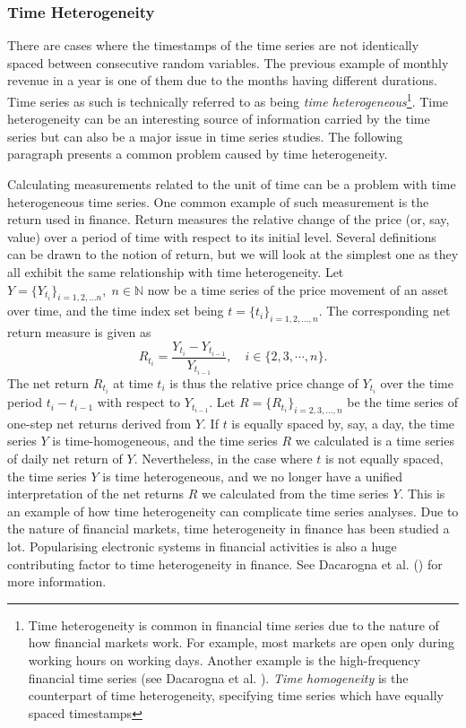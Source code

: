 \subsubsection{Time Heterogeneity}
There are cases where the timestamps of the time series are not identically spaced between consecutive random variables. The previous example of monthly revenue in a year is one of them due to the months having different durations. Time series as such is technically referred to as being \textit{time heterogeneous}\footnote{Time heterogeneity is common in financial time series due to the nature of how financial markets work. For example, most markets are open only during working hours on working days. Another example is the high-frequency financial time series (see Dacarogna et al. \citeyear{genccay2001introduction}). \textit{Time homogeneity} is the counterpart of time heterogeneity, specifying time series which have equally spaced timestamps}. Time heterogeneity can be an interesting source of information carried by the time series but can also be a major issue in time series studies. The following paragraph presents a common problem caused by time heterogeneity.

Calculating measurements related to the unit of time can be a problem with time heterogeneous time series. One common example of such measurement is the return used in finance. Return measures the relative change of the price (or, say, value) over a period of time with respect to its initial level. Several definitions can be drawn to the notion of return, but we will look at the simplest one as they all exhibit the same relationship with time heterogeneity. Let $Y = \{ Y_{t_i} \}_{i = 1, 2, \ldots n}, \; n \in \mathbb{N}$ now be a time series of the price movement of an asset over time, and the time index set being $t = \{ t_i \}_{i = 1, 2, \ldots, n}$. The corresponding net return measure is given as
\begin{equation}\label{eq: return}
R_{t_i} = \frac{Y_{t_i} - Y_{t_{i-1}}}{Y_{t_{i-1}}}, \quad i \in \{2, 3, \cdots, n \}.
\end{equation}
The net return $R_{t_i}$ at time $t_i$ is thus the relative price change of $Y_{t_i}$ over the time period $t_i - t_{i-1}$ with respect to $Y_{t_{i-1}}$. Let $R = \{ R_{t_i} \}_{i = 2, 3, \ldots, n}$ be the time series of one-step net returns derived from $Y$. If $t$ is equally spaced by, say, a day, the time series $Y$ is time-homogeneous, and the time series $R$ we calculated is a time series of daily net return of $Y$. Nevertheless, in the case where $t$ is not equally spaced, the time series $Y$ is time heterogeneous, and we no longer have a unified interpretation of the net returns $R$ we calculated from the time series $Y$. This is an example of how time heterogeneity can complicate time series analyses. Due to the nature of financial markets, time heterogeneity in finance has been studied a lot. Popularising electronic systems in financial activities is also a huge contributing factor to time heterogeneity in finance. See Dacarogna et al. (\citeyear{genccay2001introduction}) for more information.

